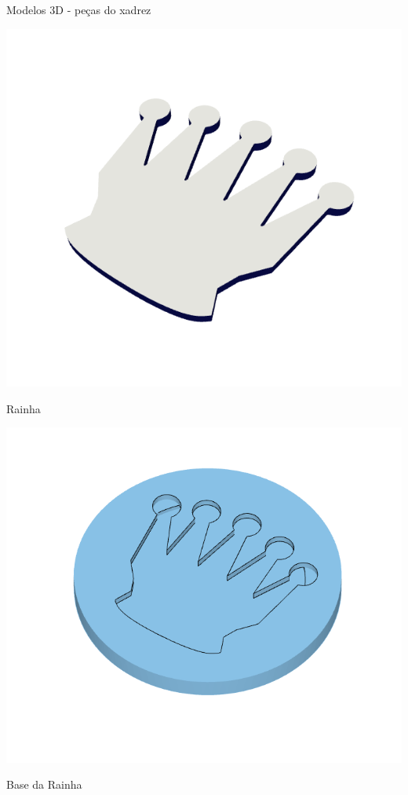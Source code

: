 \documentclass{beamer}
\begin{document}
\begin{frame}{Modelos 3D - peças do xadrez}
  \centering
  \begin{minipage}{0.48\textwidth}
    \centering
    \includegraphics[width=\linewidth,keepaspectratio]{images/rainha.png}
    \caption{Rainha}
  \end{minipage}
  \hfill
  \begin{minipage}{0.48\textwidth}
    \centering
    \includegraphics[width=\linewidth,keepaspectratio]{images/base_rainha.png}
    \caption{Base da Rainha}
  \end{minipage}
\end{frame}
\end{document}
